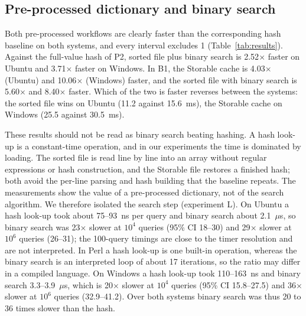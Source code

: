 \documentclass[conference]{IEEEtran}
\begin{document}
\subsection{Pre-processed dictionary and binary search}
Both pre-processed workflows are clearly faster than the corresponding hash baseline on both systems, and every interval excludes 1 (Table~\ref{tab:results}). Against the full-value hash of P2, sorted file plus binary search is 2.52$\times$ faster on Ubuntu and 3.71$\times$ faster on Windows. In B1, the Storable cache is 4.03$\times$ (Ubuntu) and 10.06$\times$ (Windows) faster, and the sorted file with binary search is 5.60$\times$ and 8.40$\times$ faster. Which of the two is faster reverses between the systems: the sorted file wins on Ubuntu (11.2 against 15.6~ms), the Storable cache on Windows (25.5 against 30.5~ms).

These results should not be read as binary search beating hashing. A hash look-up is a constant-time operation, and in our experiments the time is dominated by loading. The sorted file is read line by line into an array without regular expressions or hash construction, and the Storable file restores a finished hash; both avoid the per-line parsing and hash building that the baseline repeats. The measurements show the value of a pre-processed dictionary, not of the search algorithm. We therefore isolated the search step (experiment L). On Ubuntu a hash look-up took about 75--93~ns per query and binary search about 2.1~$\mu$s, so binary search was 23$\times$ slower at $10^4$ queries (95\% CI 18--30) and 29$\times$ slower at $10^6$ queries (26--31); the 100-query timings are close to the timer resolution and are not interpreted. In Perl a hash look-up is one built-in operation, whereas the binary search is an interpreted loop of about 17 iterations, so the ratio may differ in a compiled language. On Windows a hash look-up took 110--163~ns and binary search 3.3--3.9~$\mu$s, which is 20$\times$ slower at $10^4$ queries (95\% CI 15.8--27.5) and 36$\times$ slower at $10^6$ queries (32.9--41.2). Over both systems binary search was thus 20 to 36 times slower than the hash.
\end{document}
